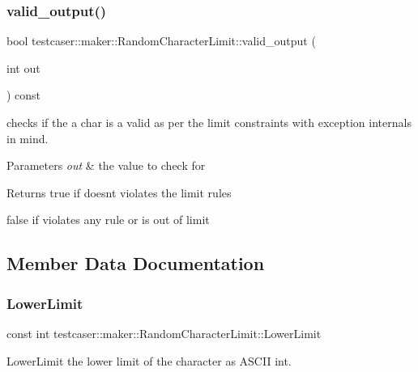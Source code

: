 \subsubsection{\texorpdfstring{valid\_output()}{valid\_output()}}
{\footnotesize\ttfamily bool testcaser\+::maker\+::\+Random\+Character\+Limit\+::valid\+\_\+output (\begin{DoxyParamCaption}\item[{int}]{out }\end{DoxyParamCaption}) const\hspace{0.3cm}{\ttfamily [inline]}}



checks if the a char is a valid as per the limit constraints with exception internals in mind. 


\begin{DoxyParams}{Parameters}
{\em out} & the value to check for \\
\hline
\end{DoxyParams}
\begin{DoxyReturn}{Returns}
true if doesn\textquotesingle{}t violates the limit rules 

false if violates any rule or is out of limit 
\end{DoxyReturn}


\subsection{Member Data Documentation}
\mbox{\label{classtestcaser_1_1maker_1_1RandomCharacterLimit_a152f8b1958ceec1128967cefa40891d9}} 
\subsubsection{\texorpdfstring{LowerLimit}{LowerLimit}}
{\footnotesize\ttfamily const int testcaser\+::maker\+::\+Random\+Character\+Limit\+::\+Lower\+Limit}



Lower\+Limit the lower limit of the character as A\+S\+C\+II int. 

\mbox{\label{classtestcaser_1_1maker_1_1RandomCharacterLimit_adf6f29860db063472c941a169b918667}} 
